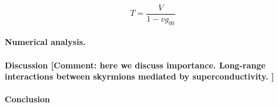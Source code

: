 \documentclass[twocolumn,showpacs,floatfix,nofootinbib,longbibliography]{revtex4-1}
\begin{document}
\begin{equation}
 T = \frac{V}{1-vg_{00}}
\end{equation}

\paragraph*{Numerical analysis.} \label{sec:numerics} 

\paragraph*{Discussion [Comment: here we discuss importance. Long-range interactions between skyrmions mediated by superconductivity. ] } \label{sec:discussion} 



\paragraph*{Conclusion} \label{sec:conclusion}




\newpage
%



\appendix 

\end{document}
